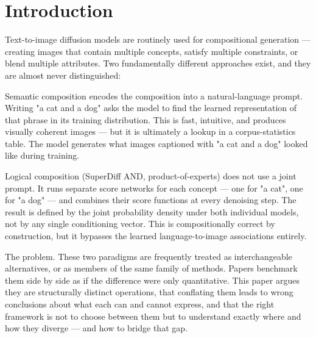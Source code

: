 \section{Introduction}
\label{sec:research_objectives_introduction}
Text-to-image diffusion models are routinely used for compositional generation — creating images that contain multiple concepts, satisfy multiple constraints, or blend multiple attributes. Two fundamentally different approaches exist, and they are almost never distinguished:

Semantic composition encodes the composition into a natural-language prompt. Writing "a cat and a dog" asks the model to find the learned representation of that phrase in its training distribution. This is fast, intuitive, and produces visually coherent images — but it is ultimately a lookup in a corpus-statistics table. The model generates what images captioned with "a cat and a dog" looked like during training.

Logical composition (SuperDiff AND, product-of-experts) does not use a joint prompt. It runs separate score networks for each concept — one for "a cat", one for "a dog" — and combines their score functions at every denoising step. The result is defined by the joint probability density under both individual models, not by any single conditioning vector. This is compositionally correct by construction, but it bypasses the learned language-to-image associations entirely.

The problem. These two paradigms are frequently treated as interchangeable alternatives, or as members of the same family of methods. Papers benchmark them side by side as if the difference were only quantitative. This paper argues they are structurally distinct operations, that conflating them leads to wrong conclusions about what each can and cannot express, and that the right framework is not to choose between them but to understand exactly where and how they diverge — and how to bridge that gap.